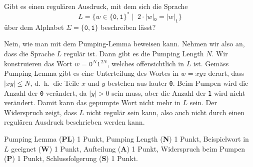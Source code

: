 Gibt es einen regulären Ausdruck, mit dem sich die Sprache
\[
L=\{
w\in\{\texttt{0},\texttt{1}\}^*
\;|\;\;
2\cdot|w|_{\texttt{0}}
=
|w|_{\texttt{1}}
\}
\]
über dem Alphabet $\Sigma=\{\texttt{0},\texttt{1}\}$ beschreiben lässt?

\begin{loesung}
Nein, wie man mit dem Pumping-Lemma beweisen kann.
Nehmen wir also an, dass die Sprache $L$ regulär ist.
Dann gibt es die Pumping Length $N$.
Wir konstruieren das Wort $w=\texttt{0}^N\texttt{1}^{2N}$, welches
offensichtlich in $L$ ist.
Gemäss Pumping-Lemma gibt es eine Unterteilung des Wortes in
$w=xyz$ derart, dass $|xy|\le N$, d.~h.~die Teile $x$ und $y$ bestehen
aus lauter \texttt{0}.
Beim Pumpen wird die Anzahl der \texttt{0} verändert, da $|y|>0$ sein
muss, aber die Anzahl der \texttt{1} wird nicht verändert.
Damit kann das gepumpte Wort nicht mehr in $L$ sein.
Der Widerspruch zeigt, dass $L$ nicht regulär sein kann, also auch nicht
durch einen regulären Ausdruck beschrieben werden kann.
\end{loesung}

\begin{bewertung}
Pumping Lemma ({\bf PL}) 1 Punkt,
Pumping Length ({\bf N}) 1 Punkt,
Beispielwort in $L$ geeignet ({\bf W}) 1 Punkt,
Aufteilung ({\bf A}) 1 Punkt,
Widerspruch beim Pumpen ({\bf P}) 1 Punkt,
Schlussfolgerung ({\bf S}) 1 Punkt.
\end{bewertung}

